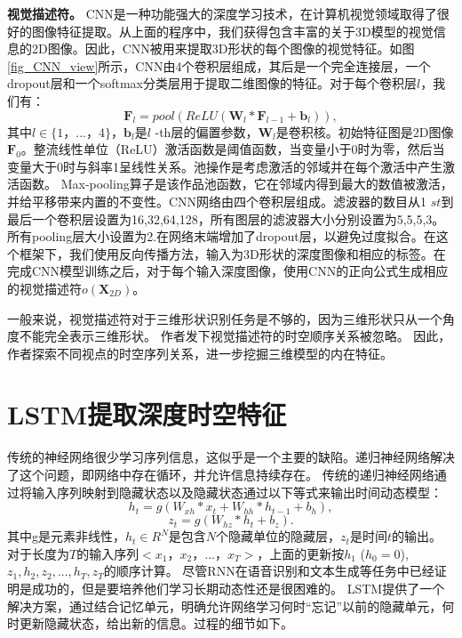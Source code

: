 \textbf {视觉描述符。} CNN是一种功能强大的深度学习技术，在计算机视觉领域取得了很好的图像特征提取。从上面的程序中，我们获得包含丰富的关于3D模型的视觉信息的2D图像。因此，CNN被用来提取3D形状的每个图像的视觉特征。如图\ref{fig_CNN_view}所示，CNN由4个卷积层组成，其后是一个完全连接层，一个dropout层和一个softmax分类层用于提取二维图像的特征。对于每个卷积层$ l $，我们有：
%
\begin{equation}
	\mathbf{F}_l = pool(ReLU(\mathbf{W}_l * \mathbf{F}_{l-1} + \mathbf{b}_l)),
\label{cal_CNN}
\end{equation}
%
其中$ l\in \{1，...，4 \} $，$ \mathbf {b} _l$是$ l $ -th层的偏置参数，$ \mathbf {W} _l $是卷积核。初始特征图是2D图像$ \mathbf {F}_0 $。整流线性单位（ReLU）激活函数是阈值函数，当变量小于0时为零，然后当变量大于0时与斜率1呈线性关系。池操作是考虑激活的邻域并在每个激活中产生激活函数。 Max-pooling算子是该作品池函数，它在邻域内得到最大的数值被激活，并给平移带来内置的不变性。CNN网络由四个卷积层组成。滤波器的数目从1 $ st $到最后一个卷积层设置为16,32,64,128，所有图层的滤波器大小分别设置为5,5,5,3。所有pooling层大小设置为2.在网络末端增加了dropout层，以避免过度拟合。在这个框架下，我们使用反向传播方法，输入为3D形状的深度图像和相应的标签。在完成CNN模型训练之后，对于每个输入深度图像，使用CNN的正向公式生成相应的视觉描述符$o(\mathbf{X}_{2D})$。

一般来说，视觉描述符对于三维形状识别任务是不够的，因为三维形状只从一个角度不能完全表示三维形状。 作者发下视觉描述符的时空顺序关系被忽略。 因此，作者探索不同视点的时空序列关系，进一步挖掘三维模型的内在特征。

\section{LSTM提取深度时空特征}

传统的神经网络很少学习序列信息，这似乎是一个主要的缺陷。递归神经网络解决了这个问题，即网络中存在循环，并允许信息持续存在。 传统的递归神经网络通过将输入序列映射到隐藏状态以及隐藏状态通过以下等式来输出时间动态模型：
%
\begin{equation}
 h_{t} = g(W_{xh}*x_{t} + W_{hh}*h_{t-1} + b_{h}),
\end{equation}
%
\begin{equation}
 z_{t} = g(W_{hz}*h_{t} + b_{z}) .
\end{equation}
%
其中g是元素非线性，$h_t \in R^N$是包含$N$个隐藏单位的隐藏层，$ z_t $是时间$ t $的输出。 对于长度为$ T $的输入序列$ <x_1，x_2，...，x_T> $，上面的更新按$h_1$ ($h_0 = 0$),$z_1, h_2, z_2, ..., h_T, z_T$的顺序计算。 尽管RNN在语音识别和文本生成等任务中已经证明是成功的，但是要培养他们学习长期动态性还是很困难的。 LSTM提供了一个解决方案，通过结合记忆单元，明确允许网络学习何时“忘记”以前的隐藏单元，何时更新隐藏状态，给出新的信息。过程的细节如下。

